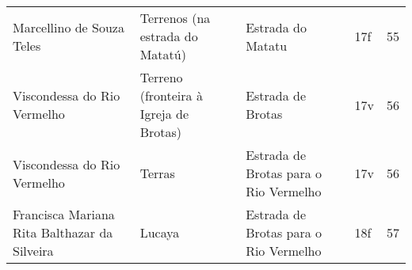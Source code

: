 \begin{table}
{\begin{minipage}{\textwidth}
\begin{tiny}
\begin{tabular}{p{4cm}p{4cm}p{4cm}ll}
Marcellino de Souza Teles							&Terrenos (na estrada do Matatú)	&Estrada do Matatu			&17f			&55			\\
Viscondessa do Rio Vermelho							&Terreno (fronteira à Igreja de Brotas)	&Estrada de Brotas			&17v			&56			\\
Viscondessa do Rio Vermelho 							&Terras					&Estrada de Brotas para o Rio Vermelho	&17v			&56			\\
Francisca Mariana Rita Balthazar da Silveira					&Lucaya					&Estrada de Brotas para o Rio Vermelho	&18f			&57			\\
\bottomrule
\end{tabular} 
\end{tiny}
\end{minipage}
}
{}
\end{table}

